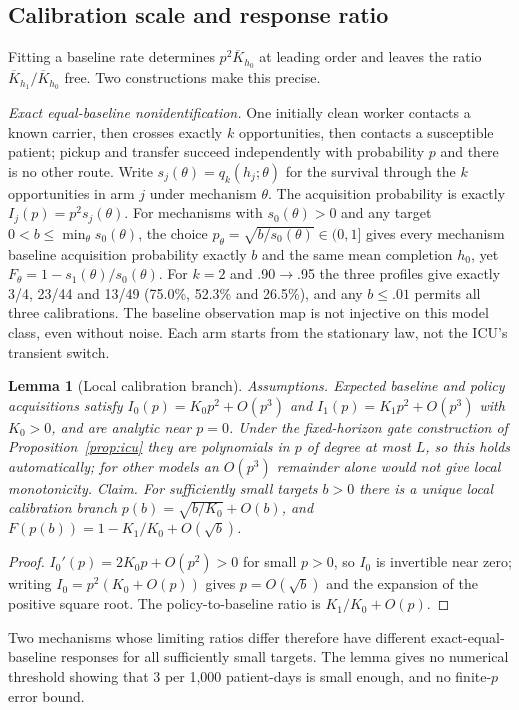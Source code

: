 \documentclass[11pt]{article}
\newtheorem{lemma}{Lemma}
\begin{document}
\subsection{Calibration scale and response ratio}\label{sec:s-proof-calibration}
Fitting a baseline rate determines $p^2\overline K_{h_0}$ at leading order and
leaves the ratio $\overline K_{h_1}/\overline K_{h_0}$ free. Two constructions make
this precise.

\emph{Exact equal-baseline nonidentification.} One initially clean worker contacts
a known carrier, then crosses exactly $k$ opportunities, then contacts a
susceptible patient; pickup and transfer succeed independently with probability
$p$ and there is no other route. Write $s_j(\theta)=q_k(h_j;\theta)$ for the
survival through the $k$ opportunities in arm $j$ under mechanism $\theta$. The
acquisition probability is exactly $I_j(p)=p^2s_j(\theta)$. For mechanisms with
$s_0(\theta)>0$ and any target $0<b\le\min_\theta s_0(\theta)$, the choice
$p_\theta=\sqrt{b/s_0(\theta)}\in(0,1]$ gives every mechanism baseline
acquisition probability exactly $b$ and the same mean completion $h_0$, yet
$F_\theta=1-s_1(\theta)/s_0(\theta)$. For
$k=2$ and .90$\to$.95 the three profiles give exactly 3/4, 23/44 and 13/49
(75.0\%, 52.3\% and 26.5\%), and any $b\le.01$ permits all three calibrations. The
baseline observation map is not injective on this model class, even without
noise. Each arm starts from the stationary law, not the ICU's transient switch.

\begin{lemma}[Local calibration branch]\label{lem:branch}
\emph{Assumptions.} Expected baseline and policy acquisitions satisfy
$I_0(p)=K_0p^2+O(p^3)$ and $I_1(p)=K_1p^2+O(p^3)$ with $K_0>0$, and are analytic
near $p=0$. Under the fixed-horizon gate construction of
Proposition~\ref{prop:icu} they are polynomials in $p$ of degree at most $L$, so
this holds automatically; for other models an $O(p^3)$ remainder alone would not
give local monotonicity. \emph{Claim.} For
sufficiently small targets $b>0$ there is a unique local calibration branch
$p(b)=\sqrt{b/K_0}+O(b)$, and $F(p(b))=1-K_1/K_0+O(\sqrt b)$.
\end{lemma}
\begin{proof}
$I_0'(p)=2K_0p+O(p^2)>0$ for small $p>0$, so $I_0$ is invertible near zero; writing
$I_0=p^2(K_0+O(p))$ gives $p=O(\sqrt b)$ and the expansion of the positive square
root. The policy-to-baseline ratio is $K_1/K_0+O(p)$.
\end{proof}
Two mechanisms whose limiting ratios differ therefore have different
exact-equal-baseline responses for all sufficiently small targets. The lemma
gives no numerical threshold showing that 3 per 1,000 patient-days is small
enough, and no finite-$p$ error bound.
\end{document}
